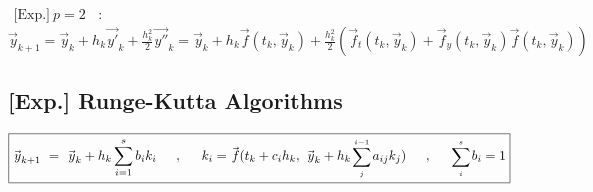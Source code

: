\documentclass[12pt]{article}
\newcommand{\hs}{\hspace{1pt}}
\newcommand{\hsvec}[1]{\vec{\hs #1}}
\newcommand{\mathscriptsize}[1]{\text{\scriptsize\(#1\)}}
\begin{document}
\underline{\(\begin{gathered}
    \text{[Exp.]}\ p=2
\end{gathered}\)}\ : 
\ \ \(
    \hsvec{y}_{k+1} = \hsvec{y}_k 
        + h_k \hsvec{y'}_k 
        + \tfrac{h_k^2}{2} \hsvec{y''}_k
    = \boxed{ \hsvec{y}_k 
        + h_k \hsvec{f}{\scriptstyle(t_k, \hsvec{y}_k)} 
        + \tfrac{h_k^2}{2} \left( \hsvec{f}_t{\scriptstyle(t_k, \hsvec{y}_k)} 
            + \hsvec{f}_y{\scriptstyle(t_k, \hsvec{y}_k)} \hsvec{f}{\scriptstyle(t_k, \hsvec{y}_k)} 
        \right) }
\)

%
%
\newpage
\subsection{[Exp.] Runge-Kutta Algorithms}

\[\boxed{
    \hsvec{y}_{k+1} \ =\ \hsvec{y}_k + h_k \sum_{i=1}^{s} b_i k_i  
    \hspace{15pt} , \hspace{15pt}
    k_i = \hsvec{f}( t_k + c_i h_k,\ \hsvec{y}_k + h_k \hs \mathscriptsize{\sum_j^{i-1}}\hs a_{ij}k_j )
    \hspace{15pt} , \hspace{15pt}
    \mathscriptsize{\sum_i^s}\hs b_i = 1
}\]
\end{document}

